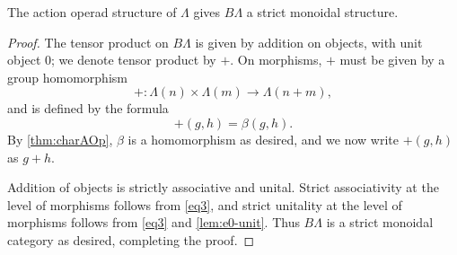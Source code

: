 \begin{prop}\label{prop:Gmonoidal}
The action operad structure of $\Lambda$ gives $B\Lambda$ a strict monoidal structure.
\end{prop}
\begin{proof}
The tensor product on $B\Lambda$ is given by addition on objects, with unit object 0; we denote tensor product by $+$. 
On morphisms, $+$ must be given by a group homomorphism
  \[
    + \colon \Lambda(n) \times \Lambda(m) \rightarrow \Lambda(n+m),
  \]
 and is defined by the formula
  \[
    +(g,h) = \beta(g,h).
  \]
By \cref{thm:charAOp}, $\beta$ is a homomorphism as desired, and we now write $+(g,h)$ as $g+h$.

Addition of objects is strictly associative and unital.
Strict associativity at the level of morphisms follows from \cref{eq3}, and strict unitality at the level of morphisms follows from \cref{eq3} and \cref{lem:e0-unit}.
Thus $B\Lambda$ is a strict monoidal category as desired, completing the proof.

\end{proof}

